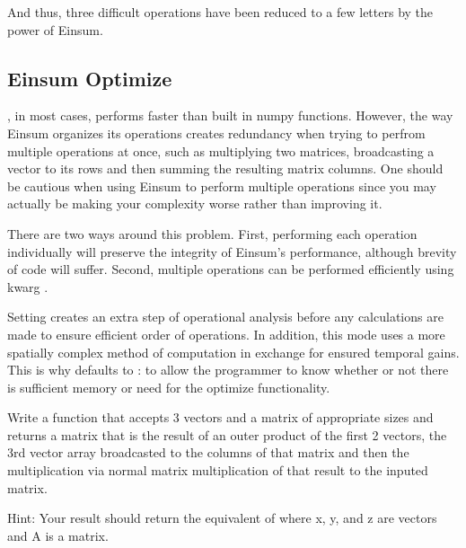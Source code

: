 \noindent And thus, three difficult operations have been reduced to a few letters by the power of Einsum.

\subsection*{Einsum Optimize}

, in most cases, performs faster than built in numpy functions. However, the way Einsum organizes its operations creates redundancy when trying to perfrom multiple operations at once, such as multiplying two matrices, broadcasting a vector to its rows and then summing the resulting matrix columns. One should be cautious when using Einsum to perform multiple operations since you may actually be making your complexity worse rather than improving it. 

There are two ways around this problem. First, performing each operation individually will preserve the integrity of Einsum's performance, although brevity of code will suffer. Second, multiple operations can be performed efficiently using kwarg .

Setting  creates an extra step of operational analysis before any calculations are made to ensure efficient order of operations. In addition, this mode uses a more spatially complex method of computation in exchange for ensured temporal gains. This is why  defaults to : to allow the programmer to know whether or not there is sufficient memory or need for the optimize functionality.

\begin{problem}
Write a function that accepts 3 vectors and a matrix of appropriate sizes and returns a matrix that is the result of an outer product of the first 2 vectors, the 3rd vector array broadcasted to the columns of that matrix and then the multiplication via normal matrix multiplication of that result to the inputed matrix.

Hint: Your result should return the equivalent of  where x, y, and z are vectors and A is a matrix.
\label{prob:outer product}
\end{problem}

